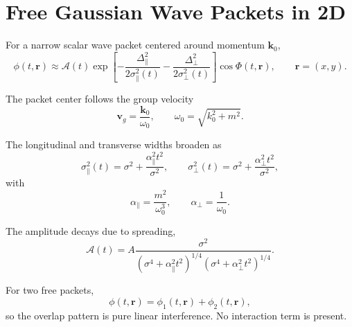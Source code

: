 \section*{Free Gaussian Wave Packets in 2D}

For a narrow scalar wave packet centered around momentum $\mathbf k_0$,
\[
\phi(t,\mathbf r)\approx
\mathcal A(t)
\exp\!\left[
-\frac{\Delta_\parallel^2}{2\sigma_\parallel^2(t)}
-\frac{\Delta_\perp^2}{2\sigma_\perp^2(t)}
\right]
\cos\Phi(t,\mathbf r),
\qquad
\mathbf r=(x,y).
\]

The packet center follows the group velocity
\[
\mathbf v_g=\frac{\mathbf k_0}{\omega_0},
\qquad
\omega_0=\sqrt{k_0^2+m^2}.
\]

The longitudinal and transverse widths broaden as
\[
\sigma_\parallel^2(t)=\sigma^2+\frac{\alpha_\parallel^2 t^2}{\sigma^2},
\qquad
\sigma_\perp^2(t)=\sigma^2+\frac{\alpha_\perp^2 t^2}{\sigma^2},
\]
with
\[
\alpha_\parallel=\frac{m^2}{\omega_0^3},
\qquad
\alpha_\perp=\frac{1}{\omega_0}.
\]

The amplitude decays due to spreading,
\[
\mathcal A(t)=
A\frac{\sigma^2}{
(\sigma^4+\alpha_\parallel^2 t^2)^{1/4}
(\sigma^4+\alpha_\perp^2 t^2)^{1/4}}.
\]

For two free packets,
\[
\phi(t,\mathbf r)=\phi_1(t,\mathbf r)+\phi_2(t,\mathbf r),
\]
so the overlap pattern is pure linear interference. No interaction term is present.
